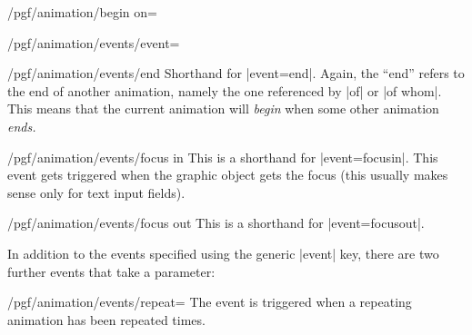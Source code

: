 \begin{key}{/pgf/animation/begin on=}
\begin{key}{/pgf/animation/events/event=}
    \begin{key}{/pgf/animation/events/end}
      Shorthand for |event=end|. Again, the ``end'' refers to the
      end of another animation, namely the one referenced by
      |of| or |of whom|. This means that the current animation will
      \emph{begin} when some other animation \emph{ends.}
\begin{codeexample}[width=2cm]
\end{codeexample}
    \end{key}
    \begin{key}{/pgf/animation/events/focus in}
      This is a shorthand for |event=focusin|. This event gets
      triggered when the graphic object gets the focus (this usually
      makes sense only for text input fields).
    \end{key}
    \begin{key}{/pgf/animation/events/focus out}
      This is a shorthand for |event=focusout|.
    \end{key}
  \end{key}

  In addition to the events specified using the generic |event| key,
  there are two further events that take a parameter:
  \begin{key}{/pgf/animation/events/repeat=}
    The event is triggered when a repeating animation has been
    repeated  times.
\begin{codeexample}[
  animation list={
    0.333/\frac{1}{3},0.666/\frac{2}{3},1,
    1.333/1\frac{1}{3},1.666/1\frac{2}{3},2,
    2.333/2\frac{1}{3},2.666/2\frac{2}{3},3,
    3.333/2\frac{1}{3},3.666/2\frac{2}{3},4}]
\end{codeexample}
  \end{key}
  

\end{key}

